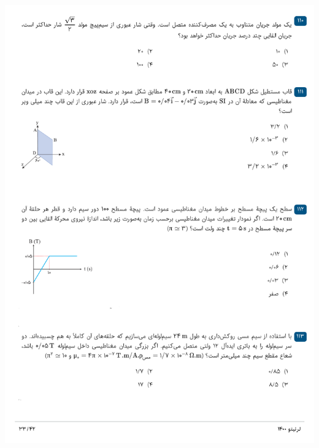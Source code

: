 \documentclass{book}
\begin{document}
\includegraphics[width=\textwidth]{"pages/33"}
\end{document}
